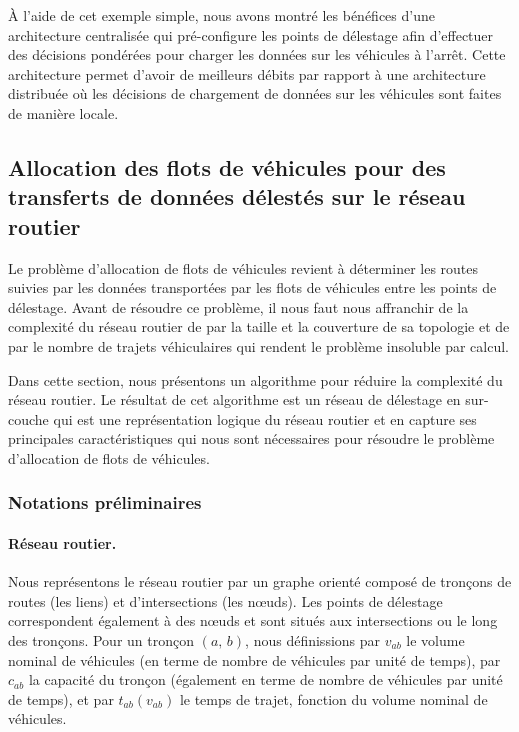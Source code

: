  
À l’aide de cet exemple simple, nous avons montré les bénéfices d’une architecture centralisée qui pré-configure les points de délestage afin d’effectuer des décisions pondérées pour charger les données sur les véhicules à l’arrêt. Cette architecture permet d’avoir de meilleurs débits par rapport à une architecture distribuée où les décisions de chargement de données sur les véhicules sont faites de manière locale.  
 
 
 
 
\subsection{Allocation des flots de véhicules pour des transferts de données délestés sur le réseau routier} 
\label{sec:modele-delestage-fr} 
 
 
Le problème d’allocation de flots de véhicules revient à déterminer les routes suivies par les données transportées par les flots de véhicules entre les points de délestage. Avant de résoudre ce problème, il nous faut nous affranchir de la complexité du réseau routier de par la taille et la couverture de sa topologie et de par le nombre de trajets véhiculaires qui rendent le problème insoluble par calcul.  
 
 
Dans cette section, nous présentons un algorithme pour réduire la complexité du réseau routier. Le résultat de cet algorithme est un réseau de délestage en sur-couche qui est une représentation logique du réseau routier et en capture ses principales caractéristiques qui nous sont nécessaires pour résoudre le problème d’allocation de flots de véhicules. 
 
 
\subsubsection{Notations préliminaires} 
 
 
\paragraph{Réseau routier.}  
Nous représentons le réseau routier par un graphe orienté composé de tronçons de routes (les liens) et d’intersections (les nœuds). Les points de délestage correspondent également à des nœuds et sont situés aux intersections ou le long des tronçons. Pour un tronçon $(a,\,b)$, nous définissions par $v_{ab}$ le volume nominal de véhicules (en terme de nombre de véhicules par unité de temps), par $c_{ab}$ la capacité du tronçon (également en terme de nombre de véhicules par unité de temps), et par $t_{ab}(v_{ab})$ le temps de trajet, fonction du volume nominal de véhicules. 
 
